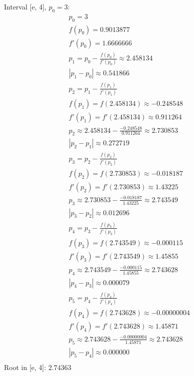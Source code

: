 \begin{enumerate}
\begin{enumerate}
        Interval [e, 4], \( p_0 = 3 \):
        \[
          \begin{array}{l}
            p_0 = 3 \\
            f(p_0) = 0.9013877 \\
            f'(p_0) = 1.6666666 \\
            p_1 = p_0 - \frac{f(p_0)}{f'(p_0)} \approx 2.458134 \\
            |p_1 - p_0| \approx 0.541866 \\
            p_2 = p_1 - \frac{f(p_1)}{f'(p_1)} \\
            f(p_1) = f(2.458134) \approx -0.248548 \\
            f'(p_1) = f'(2.458134) \approx 0.911264 \\
            p_2 \approx 2.458134 - \frac{-0.248548}{0.911264} \approx
            2.730853 \\
            |p_2 - p_1| \approx 0.272719 \\
            p_3 = p_2 - \frac{f(p_2)}{f'(p_2)} \\
            f(p_2) = f(2.730853) \approx -0.018187 \\
            f'(p_2) = f'(2.730853) \approx 1.43225 \\
            p_3 \approx 2.730853 - \frac{-0.018187}{1.43225} \approx 2.743549 \\
            |p_3 - p_2| \approx 0.012696 \\
            p_4 = p_3 - \frac{f(p_3)}{f'(p_3)} \\
            f(p_3) = f(2.743549) \approx -0.000115 \\
            f'(p_3) = f'(2.743549) \approx 1.45855 \\
            p_4 \approx 2.743549 - \frac{-0.000115}{1.45855} \approx 2.743628 \\
            |p_4 - p_3| \approx 0.000079 \\
            p_5 = p_4 - \frac{f(p_4)}{f'(p_4)} \\
            f(p_4) = f(2.743628) \approx -0.00000004 \\
            f'(p_4) = f'(2.743628) \approx 1.45871 \\
            p_5 \approx 2.743628 - \frac{-0.00000004}{1.45871}
            \approx 2.743628 \\
            |p_5 - p_4| \approx 0.000000 \\
          \end{array}
        \]
        Root in [e, 4]: \( \boxed{2.74363} \)


\end{enumerate}
\end{enumerate}
